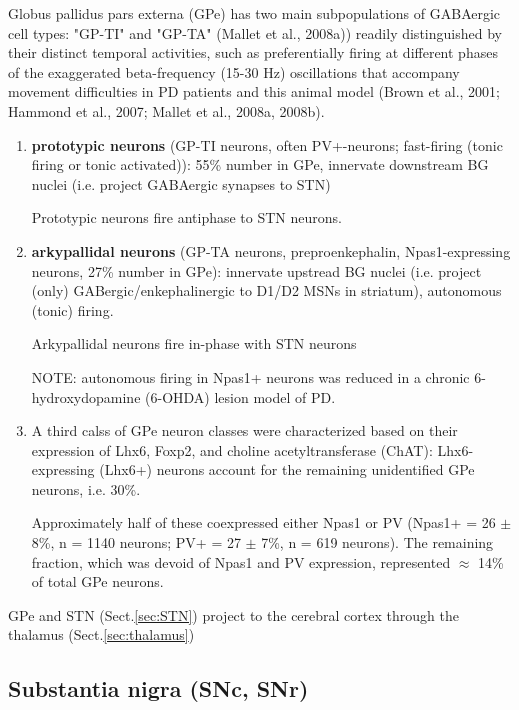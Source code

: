 Globus pallidus pars externa (GPe) has two main subpopulations of GABAergic cell
types: "GP-TI" and "GP-TA" (Mallet et al., 2008a)) readily distinguished by
their distinct temporal activities, such as preferentially firing at different
phases of the exaggerated beta-frequency (15-30 Hz) oscillations that accompany
movement difficulties in PD patients and this animal model (Brown et al., 2001;
Hammond et al., 2007; Mallet et al., 2008a, 2008b).

\begin{enumerate}
  \item {\bf prototypic neurons} (GP-TI neurons, often PV+-neurons; fast-firing
  (tonic firing or tonic activated)): 55\% number in GPe, innervate
  downstream BG nuclei (i.e. project GABAergic synapses to STN)
  
  Prototypic neurons fire antiphase to STN neurons.
  
  
  
  \item {\bf arkypallidal neurons} (GP-TA neurons, preproenkephalin,
  Npas1-expressing neurons, 27\% number in GPe):  innervate upstread BG nuclei
  (i.e. project (only) GABergic/enkephalinergic to D1/D2 MSNs in striatum),
  autonomous (tonic) firing.
  
Arkypallidal neurons fire in-phase with STN neurons

  
NOTE: autonomous firing in Npas1+ neurons was reduced in a chronic
6-hydroxydopamine (6-OHDA) lesion model of PD.

  \item A third calss of GPe neuron classes were characterized based on their
  expression of Lhx6, Foxp2, and choline acetyltransferase (ChAT):
   Lhx6-expressing (Lhx6+) neurons account for the remaining unidentified
   GPe neurons, i.e. 30\%.
   
   Approximately half of these coexpressed either Npas1 or PV (Npas1+ = 26 $\pm$
   8\%, n = 1140 neurons; PV+ = 27 $\pm$ 7\%, n = 619 neurons).
   The remaining fraction, which was devoid of Npas1 and PV expression,
   represented $\approx$ 14\% of total GPe neurons.
\end{enumerate}


GPe and STN (Sect.\ref{sec:STN}) project to the cerebral cortex through the
thalamus (Sect.\ref{sec:thalamus})


\subsection{Substantia nigra (SNc, SNr)}   
\label{sec:substantia_nigra}

